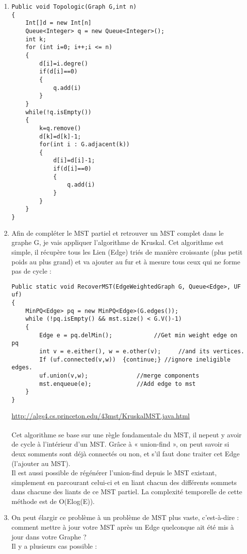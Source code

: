 \documentclass[11pt]{article}
\begin{document}
\begin{enumerate}
\item 
\begin{lstlisting}
Public void Topologic(Graph G,int n)
{
	Int[]d = new Int[n]
	Queue<Integer> q = new Queue<Integer>();
	int k;
	for (int i=0; i++;i <= n)
	{
		d[i]=i.degre()
		if(d[i]==0)
		{
			q.add(i)
		}
	}
	while(!q.isEmpty())
	{
		k=q.remove()
		d[k]=d[k]-1;
		for(int i : G.adjacent(k))
		{
			d[i]=d[i]-1;
			if(d[i]==0)
			{
				q.add(i)
			}
		}
	}
}

\end{lstlisting} 

\item Afin de compléter le MST partiel et retrouver un MST complet dans le graphe G, je vais appliquer l’algorithme de Kruskal. Cet algorithme est simple, il récupère tous les Lien (Edge) triés de manière croissante (plus petit poids au plus grand) et va ajouter au fur et à mesure tous ceux qui ne forme pas de cycle :
\\
\begin{lstlisting}
Public static void RecoverMST(EdgeWeightedGraph G, Queue<Edge>, UF uf)
{
	MinPQ<Edge> pq = new MinPQ<Edge>(G.edges());
	while (!pq.isEmpty() && mst.size() < G.V()-1)
	{
		Edge e = pq.delMin();   		 //Get min weight edge on pq
		int v = e.either(), w = e.other(v); 	//and its vertices.
		If (uf.connected(v,w))  {continue;}	//ignore ineligible edges.
		uf.union(v,w); 				//merge components 
		mst.enqueue(e);				//Add edge to mst
	}
}
\end{lstlisting} 

\url{http://algs4.cs.princeton.edu/43mst/KruskalMST.java.html}
\\
\\
Cet algorithme se base sur une règle fondamentale du MST, il nepeut y avoir de cycle à l’intérieur d’un MST. Grâce à « union-find », on peut savoir si deux somments sont déjà connectés ou non, et s’il faut donc traiter cet Edge (l’ajouter au MST).
\\
Il est aussi possible de régénérer l’union-find depuis le MST existant, simplement en parcourant celui-ci et en liant chacun des différents sommets dans chacune des liants de ce MST partiel.
La complexité temporelle de cette méthode est de O(Elog(E)).

\item On peut élargir ce problème à un problème de MST plus vaste, c’est-à-dire : comment mettre à jour votre MST après un Edge quelconque  ait été mis à jour dans votre Graphe ? \\
Il y a plusieurs cas possible : \\


\end{enumerate}
\end{document}

